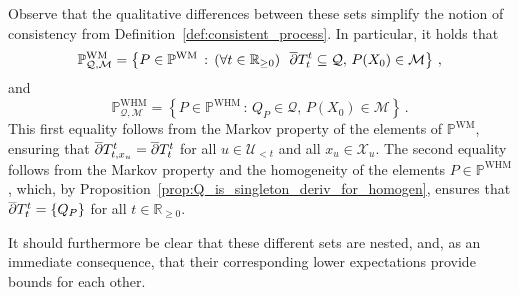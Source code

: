 \documentclass[10pt,a4paper]{paper}
\theoremstyle{definition}
\newtheorem{proposition}[theorem]{Proposition}
\newcommand{\reals}{\mathbb{R}}
\newcommand{\realsnonneg}{\reals_{\geq 0}}
\newcommand{\states}{\mathcal{X}}
\newcommand{\processes}{\mathbb{P}}
\newcommand{\wmprocesses}{\processes^{\mathrm{WM}}}
\newcommand{\whmprocesses}{\processes^{\mathrm{WHM}}}
\newcommand{\rateset}{\mathcal{Q}}
\begin{document}
Observe that the qualitative differences between these sets simplify the notion of consistency from Definition~\ref{def:consistent_process}. In particular, it holds that
\begin{equation*}
\wmprocesses_{\rateset,\mathcal{M}} = \left\{P\in\wmprocesses\,:\,(\forall t\in\realsnonneg)~~ \smash{\overline{\partial}}T_t^t\subseteq\rateset,\,P(X_0)\in\mathcal{M}\right\}\,,
\end{equation*}
and
\begin{equation*}
\whmprocesses_{\rateset,\mathcal{M}} = \left\{P\in\whmprocesses\,:\,Q_P\in\rateset,\,P(X_0)\in\mathcal{M}\right\}\,.
\end{equation*}
This first equality follows from the Markov property of the elements of $\wmprocesses$, ensuring that $\smash{\overline{\partial}}T_{t,x_u}^t=\smash{\overline{\partial}}T_t^t$ for all $u\in\mathcal{U}_{<t}$ and all $x_u\in\states_u$. The second equality follows from the Markov property and the homogeneity of the elements $P\in\whmprocesses$, which, by Proposition~\ref{prop:Q_is_singleton_deriv_for_homogen}, ensures that $\smash{\overline{\partial}}T_t^t=\{Q_P\}$ for all $t\in\realsnonneg$.

It should furthermore be clear that these different sets are nested, and, as an immediate consequence, that their corresponding lower expectations provide bounds for each other.
\end{document}
